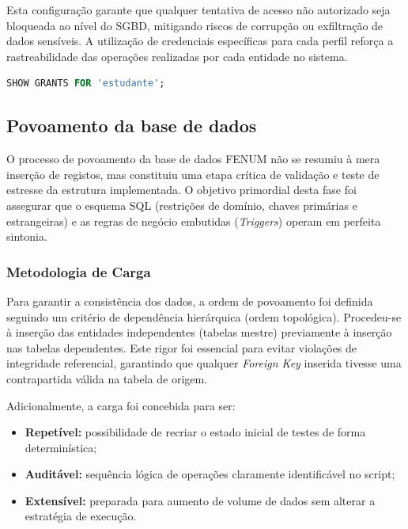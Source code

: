 \documentclass[12pt,a4paper]{article}
\begin{document}
Esta configuração garante que qualquer tentativa de acesso não autorizado seja
bloqueada ao nível do SGBD, mitigando riscos de corrupção ou exfiltração de
dados sensíveis. A utilização de credenciais específicas para cada perfil
reforça a rastreabilidade das operações realizadas por cada entidade no sistema.

\begin{lstlisting}[language=SQL, caption={exemplo de utilização das permissões}, label={lst:roles}]
SHOW GRANTS FOR 'estudante';
\end{lstlisting}

\subsection{Povoamento da base de dados}

O processo de povoamento da base de dados FENUM não se resumiu à mera inserção
de registos, mas constituiu uma etapa crítica de validação e teste de estresse
da estrutura implementada. O objetivo primordial desta fase foi assegurar que o
esquema SQL (restrições de domínio, chaves primárias e estrangeiras) e as regras
de negócio embutidas (\textit{Triggers}) operam em perfeita sintonia.

\subsubsection*{Metodologia de Carga}
Para garantir a consistência dos dados, a ordem de povoamento foi definida
seguindo um critério de dependência hierárquica (ordem topológica). Procedeu-se
à inserção das entidades independentes (tabelas mestre) previamente à inserção
nas tabelas dependentes. Este rigor foi essencial para evitar violações de
integridade referencial, garantindo que qualquer \textit{Foreign Key} inserida
tivesse uma contrapartida válida na tabela de origem.

Adicionalmente, a carga foi concebida para ser:
\begin{itemize}[leftmargin=1.5cm]
    \item \textbf{Repetível:} possibilidade de recriar o estado inicial de testes de forma determinística;
    \item \textbf{Auditável:} sequência lógica de operações claramente identificável no script;
    \item \textbf{Extensível:} preparada para aumento de volume de dados sem alterar a estratégia de execução.
\end{itemize}
\end{document}
